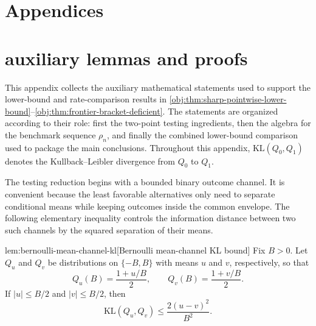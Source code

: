 \documentclass[11pt]{article}
\begin{document}
\appendix

\section*{Appendices}

\section{auxiliary lemmas and proofs}

This appendix collects the auxiliary mathematical statements used to support the lower-bound and rate-comparison results in \cref{obj:thm:sharp-pointwise-lower-bound}--\cref{obj:thm:frontier-bracket-deficient}. The statements are organized according to their role: first the two-point testing ingredients, then the algebra for the benchmark sequence \(\rho_n\), and finally the combined lower-bound comparison used to package the main conclusions. Throughout this appendix, \(\mathrm{KL}(Q_0,Q_1)\) denotes the Kullback--Leibler divergence from \(Q_0\) to \(Q_1\).

The testing reduction begins with a bounded binary outcome channel. It is convenient because the least favorable alternatives only need to separate conditional means while keeping outcomes inside the common envelope. The following elementary inequality controls the information distance between two such channels by the squared separation of their means.

\begin{lemmav}{lem:bernoulli-mean-channel-kl}[Bernoulli mean-channel KL bound]
Fix \(B>0\). Let \(Q_u\) and \(Q_v\) be distributions on \(\{-B,B\}\) with means \(u\) and \(v\), respectively, so that
\[
Q_u(B)=\frac{1+u/B}{2},
\qquad
Q_v(B)=\frac{1+v/B}{2}.
\]
If \(|u|\le B/2\) and \(|v|\le B/2\), then
\[
\mathrm{KL}(Q_u,Q_v)
\le
\frac{2(u-v)^2}{B^2}.
\]
\end{lemmav}
\end{document}
